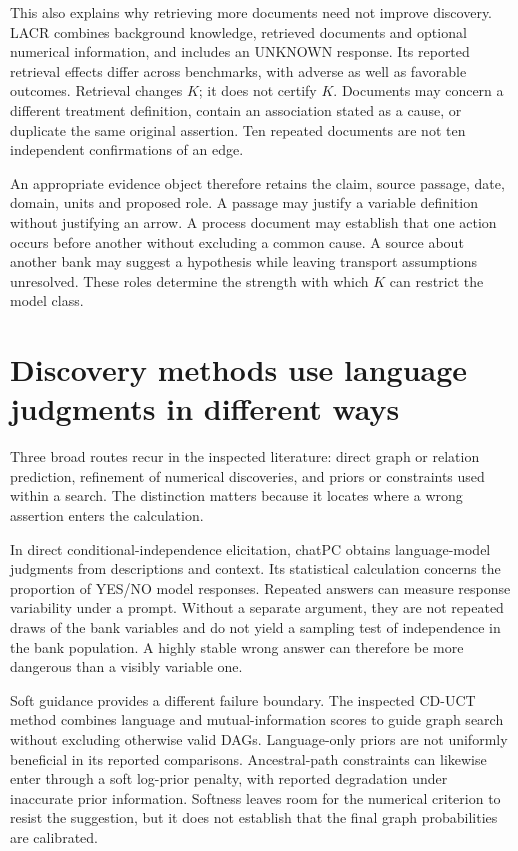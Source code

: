 This also explains why retrieving more documents need not improve discovery.
LACR combines background knowledge, retrieved documents and optional numerical
information, and includes an UNKNOWN response. Its reported retrieval effects
differ across benchmarks, with adverse as well as favorable outcomes.
\cite{v12_la_2402_15301} Retrieval changes $K$; it does not certify $K$. Documents
may concern a different treatment definition, contain an association stated as
a cause, or duplicate the same original assertion. Ten repeated documents are
not ten independent confirmations of an edge.

An appropriate evidence object therefore retains the claim, source passage,
date, domain, units and proposed role. A passage may justify a variable
definition without justifying an arrow. A process document may establish that
one action occurs before another without excluding a common cause. A source
about another bank may suggest a hypothesis while leaving transport assumptions
unresolved. These roles determine the strength with which $K$ can restrict the
model class.

\section{Discovery methods use language judgments in different ways}

Three broad routes recur in the inspected literature: direct graph or relation
prediction, refinement of numerical discoveries, and priors or constraints used
within a search. \cite{v12_la_2402_11068} The distinction matters because it locates
where a wrong assertion enters the calculation.

In direct conditional-independence elicitation, chatPC obtains language-model
judgments from descriptions and context. Its statistical calculation concerns
the proportion of YES/NO model responses. \cite{v12_la_2406_07378} Repeated answers
can measure response variability under a prompt. Without a separate argument,
they are not repeated draws of the bank variables and do not yield a sampling
test of independence in the bank population. A highly stable wrong answer can
therefore be more dangerous than a visibly variable one.

Soft guidance provides a different failure boundary. The inspected CD-UCT
method combines language and mutual-information scores to guide graph search
without excluding otherwise valid DAGs. Language-only priors are not uniformly
beneficial in its reported comparisons. \cite{v12_la_2405_13551} Ancestral-path
constraints can likewise enter through a soft log-prior penalty, with reported
degradation under inaccurate prior information. \cite{v12_la_2306_16902} Softness
leaves room for the numerical criterion to resist the suggestion, but it does
not establish that the final graph probabilities are calibrated.

